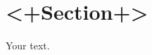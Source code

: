\documentclass[../../main.tex]{subfiles} %
\begin{document}
\section{<+Section+>}
Your text.
\end{document}
